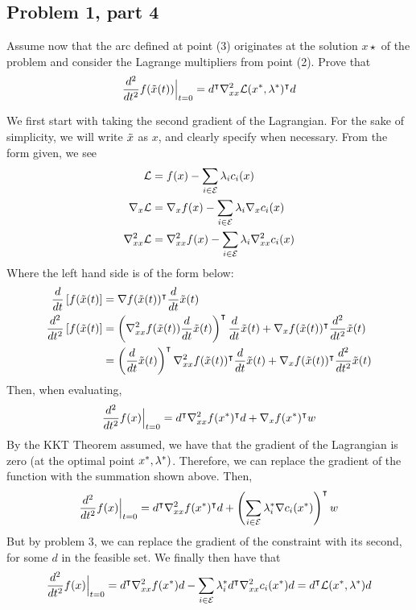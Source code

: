 \subsection{Problem 1, part 4}
Assume now that the arc defined at point (3) originates at the solution $x\star$ of the problem and consider the Lagrange multipliers from point (2). Prove that
\[\frac{d^2}{dt^2}f(\Tilde{x}(t)) \Big|_{t = 0} = d^{\intercal} \nabla_{xx}^2 \mathcal{L} (x^{*}, \mathrm{\lambda}^{*})^{\intercal} d\]
\partbreak
\begin{solution}

    We first start with taking the second gradient of the Lagrangian. For the sake of simplicity, we will write $\Tilde{x}$ as $x$, and clearly specify when necessary. From the form given, we see
    \begin{align*}
        \mathcal{L} &= f(x) - \sum_{i \in \mathcal{E}} \mathrm{\lambda}_i c_i(x) \\
        \nabla_x \mathcal{L} &= \nabla_x f(x) - \sum_{i \in \mathcal{E}} \mathrm{\lambda}_i \nabla_x c_i(x)\\
        \nabla_{xx}^2 \mathcal{L} &= \nabla_{xx}^2 f(x) - \sum_{i \in \mathcal{E}} \mathrm{\lambda}_i \nabla_{xx}^2 c_i(x)
    \end{align*}
    Where the left hand side is of the form below:
    \tightalignbreak
    \begin{align*}
        \frac{d}{dt}\left[ f(\Tilde{x}(t)\right] &= \nabla f(\Tilde{x}(t)) ^{\intercal} \frac{d}{dt}\Tilde{x}(t)\\
        \frac{d^2}{dt^2}\left[ f(\Tilde{x}(t) \right] &= \left( \nabla^2_{xx} f(\Tilde{x}(t)) \frac{d}{dt}\Tilde{x}(t)\right)^{\intercal} \frac{d}{dt}\Tilde{x}(t) + \nabla_{x} f(\Tilde{x}(t))^{\intercal} \frac{d^2}{dt^2}\Tilde{x}(t)\\
        &= \left(\frac{d}{dt}\Tilde{x}(t)\right)^{\intercal} \nabla^2_{xx} f(\Tilde{x}(t))^{\intercal} \frac{d}{dt}\Tilde{x}(t) + \nabla_{x} f(\Tilde{x}(t))^{\intercal} \frac{d^2}{dt^2}\Tilde{x}(t)
    \end{align*}
    \vspace{-12mm}\alignbreak
    Then, when evaluating,
    \[\frac{d^2}{dt^2}f(x)\Big|_{t=0} = d^{\intercal} \nabla^2_{xx} f(x^{*})^{\intercal} d + \nabla_x f(x^{*})^{\intercal} w\]
    By the KKT Theorem assumed, we have that the gradient of the Lagrangian is zero (at the optimal point $x^{*}, \mathrm{\lambda}^{*})$. Therefore, we can replace the gradient of the function with the summation shown above. Then,
    \[\frac{d^2}{dt^2}f(x)\Big|_{t=0} = d^{\intercal} \nabla^2_{xx} f(x^{*})^{\intercal} d + \left(\sum_{i \in \mathcal{E}} \mathrm{\lambda}_i^{*} \nabla c_i(x^{*})\right)^{\intercal} w\]
    But by problem 3, we can replace the gradient of the constraint with its second, for some $d$ in the feasible set. We finally then have that
    \[\frac{d^2}{dt^2}f(x)\Big|_{t=0} = d^{\intercal} \nabla_{xx}^2f(x^{*})d - \sum_{i \in \mathcal{E}} \mathrm{\lambda}_i^{*} d^{\intercal} \nabla_{xx}^2 c_i(x^{*})d = d^{\intercal} \mathcal{L}(x^{*}, \mathrm{\lambda}^{*})d\]
\end{solution}

